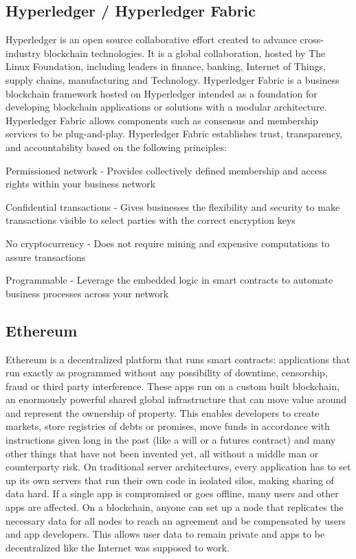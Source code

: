 \subsection*{Hyperledger / Hyperledger Fabric}
Hyperledger is an open source collaborative effort created to advance cross-industry blockchain technologies. It is a global collaboration, hosted by The Linux Foundation, including leaders in finance, banking, Internet of Things, supply chains, manufacturing and Technology.
Hyperledger Fabric is a business blockchain framework hosted on Hyperledger intended as a foundation for developing blockchain applications or solutions with a modular architecture. Hyperledger Fabric allows components such as consensus and membership services to be plug-and-play.
Hyperledger Fabric establishes trust, transparency, and accountability based on the following principles:
\begin{list}{}{}
\item Permissioned network - Provides collectively defined membership and access rights within your business network
\item Confidential transactions - Gives businesses the flexibility and security to make transactions visible to select parties with the correct encryption keys
\item No cryptocurrency - Does not require mining and expensive computations to assure transactions
\item Programmable - Leverage the embedded logic in smart contracts to automate business processes across your network
\end{list}

\subsection*{Ethereum}
Ethereum is a  decentralized platform that runs smart contracts: applications that run exactly as programmed without any possibility of downtime, censorship, fraud or third party interference.
These apps run on a custom built  blockchain, an enormously powerful shared global infrastructure that can move value around and represent the ownership of property. This enables developers to create markets, store registries of debts or promises, move funds in accordance with instructions given long in the past (like a will or a futures contract) and many other things that have not been invented yet, all without a middle man or counterparty risk.
On traditional server architectures, every application has to set up its own servers that run their own code in isolated silos, making sharing of data hard. If a single app is compromised or goes offline, many users and other apps are affected.
On a blockchain, anyone can set up a node that replicates the necessary data for all nodes to reach an agreement and be compensated by users and app developers. This allows user data to remain private and apps to be decentralized like the Internet was supposed to work.

